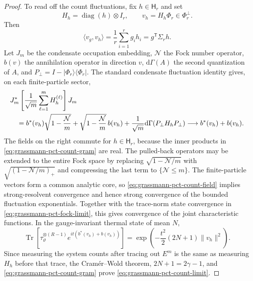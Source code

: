 \documentclass[11pt]{article}
\theoremstyle{remark}
\theoremstyle{plain}
\newcommand{\dd}{\mathrm d}
\newcommand{\diag}{\operatorname{diag}}
\newcommand{\Tr}{\operatorname{Tr}}
\newcommand{\proj}[1]{|#1\rangle\!\langle #1|}
\newcommand{\ot}{\otimes}
\begin{document}
\begin{proof}
To read off the count fluctuations, fix \(h\in\mathsf H_r\) and set
\[
  H_h=\diag(h)\ot I_r,
  \qquad
  v_h=H_h\Phi_r\in\Phi_r^\perp.
\]
Then
\begin{equation}
  \langle v_g,v_h\rangle
  =\frac1r\sum_{i=1}^r g_ih_i
  =g^{\mathsf T}\Sigma_r h.
  \label{eq:grassmann-pct-count-gram}
\end{equation}
Let \(J_m\) be the condensate occupation embedding, \(\mathcal N\) the
Fock number operator, \(b(v)\) the annihilation operator in direction
\(v\), \(\dd\Gamma(A)\) the second quantization of \(A\), and
\(P_\perp=I-\proj{\Phi_r}\).  The standard condensate fluctuation identity
gives, on each finite-particle sector,
\begin{align}
 &J_m^*\left[
   \frac1{\sqrt m}\sum_{\ell=1}^m H_h^{(\ell)}
 \right]J_m\notag\\
 &\quad=
 b^*(v_h)\sqrt{1-\frac{\mathcal N}{m}}
 +\sqrt{1-\frac{\mathcal N}{m}}\,b(v_h)
 +\frac1{\sqrt m}\dd\Gamma(P_\perp H_hP_\perp)
 \longrightarrow b^*(v_h)+b(v_h).
 \label{eq:grassmann-pct-count-field}
\end{align}
The fields on the right commute for \(h\in\mathsf H_r\), because the
inner products in \eqref{eq:grassmann-pct-count-gram} are real.  The
pulled-back operators may be extended to the entire Fock space by replacing
\(\sqrt{1-\mathcal N/m}\) with
\(\sqrt{(1-\mathcal N/m)_+}\) and compressing the last term to
\(\{\mathcal N\le m\}\).  The finite-particle vectors form a common
analytic core, so \eqref{eq:grassmann-pct-count-field} implies
strong-resolvent convergence and hence strong convergence of the bounded
fluctuation exponentials.
Together with the trace-norm state convergence in
\eqref{eq:grassmann-pct-fock-limit}, this gives convergence of the joint
characteristic functions.  In the gauge-invariant thermal state of mean
\(N\),
\[
  \Tr\!\left[
    \tau_\vartheta^{\ot(R-1)}
    e^{it(b^*(v_h)+b(v_h))}
  \right]
  =\exp\!\left(-\frac{t^2}{2}(2N+1)\|v_h\|^2\right).
\]
Since measuring the system counts after tracing out \(E^m\) is the same as
measuring \(H_h\) before that trace, the Cram\'er--Wold theorem,
\(2N+1=2\gamma-1\), and
\eqref{eq:grassmann-pct-count-gram} prove
\eqref{eq:grassmann-pct-count-limit}.


\end{proof}
\end{document}
